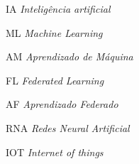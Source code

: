 \begin{siglas}
    \item IA \emph{Inteligência artificial}
    \item ML \emph{Machine Learning}
    \item AM \emph{Aprendizado de Máquina}
    \item FL \emph{Federated Learning}
    \item AF \emph{Aprendizado Federado}
    \item RNA \emph{Redes Neural Artificial}
    \item IOT \emph{Internet of things}
\end{siglas}

